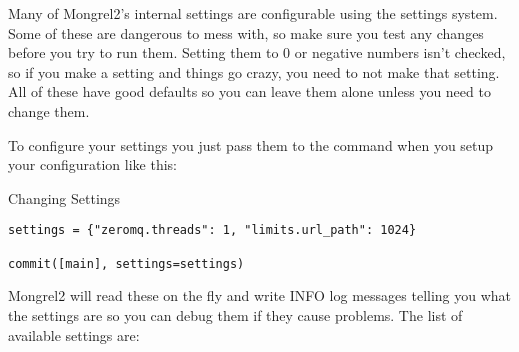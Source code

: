 Many of Mongrel2's internal settings are configurable using the settings system.
Some of these are dangerous to mess with, so make sure you test any changes before
you try to run them.  Setting them to 0 or negative numbers isn't checked, so if
you make a setting and things go crazy, you need to not make that setting.  All
of these have good defaults so you can leave them alone unless you need to change
them.

To configure your settings you just pass them to the  command when
you setup your configuration like this:

\begin{code}{Changing Settings}
\begin{lstlisting}
settings = {"zeromq.threads": 1, "limits.url_path": 1024}

commit([main], settings=settings)
\end{lstlisting}
\end{code}

Mongrel2 will read these on the fly and write INFO log messages telling you
what the settings are so you can debug them if they cause problems.  The list
of available settings are:

